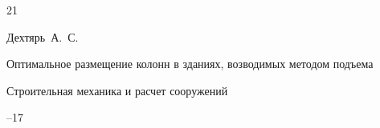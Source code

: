 \begin{thebibliography}{21}















\by Дехтярь~А.~С.

\paper Оптимальное размещение колонн в зданиях, возводимых методом подъема

\jour Строительная механика и расчет сооружений



--17



















\end{thebibliography}
